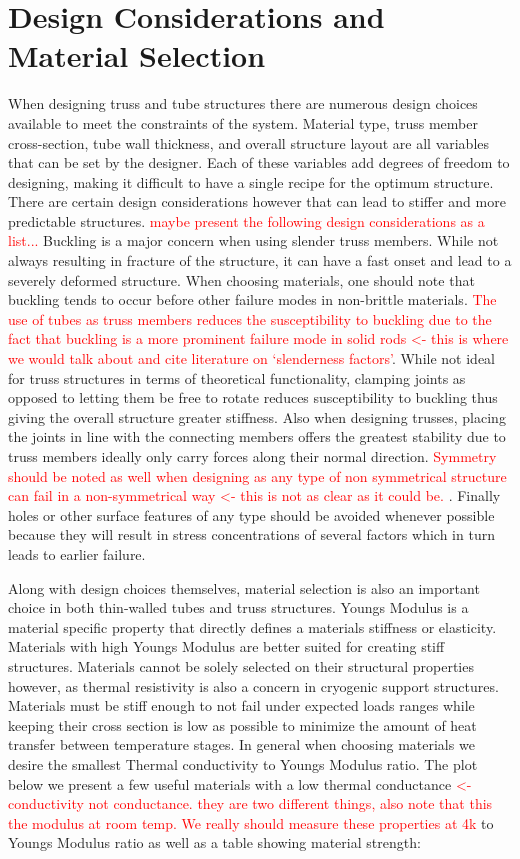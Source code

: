 \documentclass[final]{svjour2}
\begin{document}
\section{Design Considerations and Material Selection}
When designing truss and tube structures there are numerous design choices available to meet the constraints of the system.  Material type, truss member cross-section, tube wall thickness, and overall structure layout are all variables that can be set by the designer.  Each of these variables add degrees of freedom to designing, making it difficult to have a single recipe for the optimum structure.  There are certain design considerations however that can lead to stiffer and more predictable structures.  \textcolor{red}{maybe present the following design considerations as a list...} Buckling is a major concern when using slender truss members.  While not always resulting in fracture of the structure, it can have a fast onset and lead to a severely deformed structure.  When choosing materials, one should note that buckling tends to occur before other failure modes in non-brittle materials. \textcolor{red}{The use of tubes as truss members reduces the susceptibility to buckling due to the fact that buckling is a more prominent failure mode in solid rods <- this is where we would talk about and cite literature on  `slenderness factors'}.  While not ideal for truss structures in terms of theoretical functionality, clamping joints as opposed to letting them be free to rotate reduces susceptibility to buckling thus giving the overall structure greater stiffness. Also when designing trusses, placing the joints in line with the connecting members offers the greatest stability due to truss members ideally only carry forces along their normal direction.  \textcolor{red}{Symmetry should be noted as well when designing as any type of non symmetrical structure can fail in a non-symmetrical way <- this is not as clear as it could be. }.  Finally holes or other surface features of any type should be avoided whenever possible because they will result in stress concentrations of several factors which in turn leads to earlier failure.  

Along with design choices themselves, material selection is also an important  choice in both thin-walled tubes and truss structures. Youngs Modulus is a material specific property that directly defines a materials stiffness or elasticity.  Materials with high Youngs Modulus are better suited for creating stiff structures. Materials cannot be solely selected on their structural properties however, as thermal resistivity is also a concern in cryogenic support structures.  Materials must be stiff enough to not fail under expected loads ranges while keeping their cross section is low as possible to minimize the amount of heat transfer between temperature stages.  In general when choosing materials we desire the smallest Thermal conductivity to Youngs Modulus ratio.  The plot below we present a few useful materials with a low thermal conductance \textcolor{red}{<- conductivity not conductance. they are two different things, also note that this the modulus at room temp. We really should measure these properties at 4k} to Youngs Modulus ratio as well as a table showing material strength:
\end{document}
